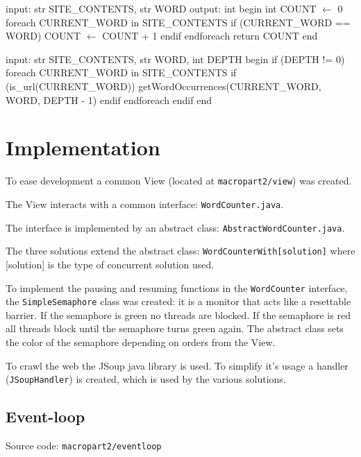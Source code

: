\documentclass[12pt, a4paper]{report}
\begin{document}
\newpage

\begin{algorithm}[caption={countTask expressed in pseudocode}, label={alg1}]
input: str SITE_CONTENTS, str WORD
output: int
begin
    int COUNT $\gets$ 0
    foreach CURRENT_WORD in SITE_CONTENTS
        if (CURRENT_WORD == WORD)
            COUNT $\gets$ COUNT + 1
        endif
    endforeach
    return COUNT
end       
\end{algorithm}

\begin{algorithm}[caption={linkTask expressed in pseudocode}, label={alg2}]
input: str SITE_CONTENTS, str WORD, int DEPTH
begin
    if (DEPTH != 0)
        foreach CURRENT_WORD in SITE_CONTENTS
            if (is_url(CURRENT_WORD))
                getWordOccurrences(CURRENT_WORD, WORD, DEPTH - 1)
            endif
        endforeach
    endif
end       
\end{algorithm}

\section{Implementation}
To ease development a common View (located at \texttt{macropart2/view}) was created.

The View interacts with a common interface: \texttt{WordCounter.java}.
 
The interface is implemented by an abstract class: \texttt{AbstractWordCounter.java}. 

The three solutions extend the abstract class: \texttt{WordCounterWith[solution]} where [solution] is the type of concurrent solution used.

To implement the pausing and resuming functions in the
 \texttt{WordCounter} interface, the \texttt{SimpleSemaphore} class was created: it is a monitor that acts like a resettable barrier. If the
 semaphore is green no threads are blocked. If the semaphore is red all threads block until the semaphore turns green again. 
 The abstract class sets the color of the semaphore depending on orders from the View.

To crawl the web the JSoup java library is used. To simplify it's usage a handler (\texttt{JSoupHandler}) is created, which is used by the various solutions.

\subsection{Event-loop}
Source code: \texttt{macropart2/eventloop}
\end{document}
